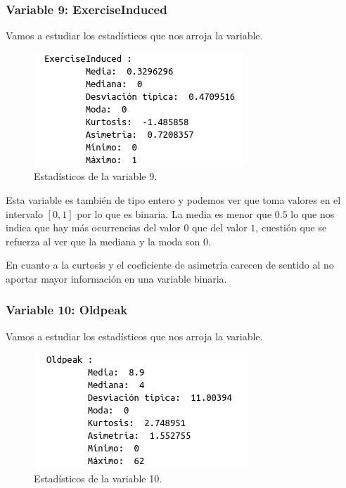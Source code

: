 \documentclass[12pt,a4paper]{article}
\begin{document}
\subsubsection*{Variable 9: ExerciseInduced}

Vamos a estudiar los estadísticos que nos arroja la variable.

\begin{figure}[H]
	\centering
	\includegraphics[scale=0.7]{./Imagenes/EDA/Clasificacion/estadisticos_variable9.png}
	\caption{Estadísticos de la variable 9.}
\end{figure}

Esta variable es también de tipo entero y podemos ver que toma valores en el intervalo $[0,1]$ por lo que es binaria. La media es menor que $0.5$ lo que nos indica que hay más ocurrencias del valor $0$ que del valor $1$, cuestión que se refuerza al ver que la mediana y la moda son $0$.

En cuanto a la curtosis y el coeficiente de asimetría carecen de sentido al no aportar mayor información en una variable binaria.

\subsubsection*{Variable 10: Oldpeak}

Vamos a estudiar los estadísticos que nos arroja la variable.

\begin{figure}[H]
	\centering
	\includegraphics[scale=0.7]{./Imagenes/EDA/Clasificacion/estadisticos_variable10.png}
	\caption{Estadísticos de la variable 10.}
\end{figure}
\end{document}
